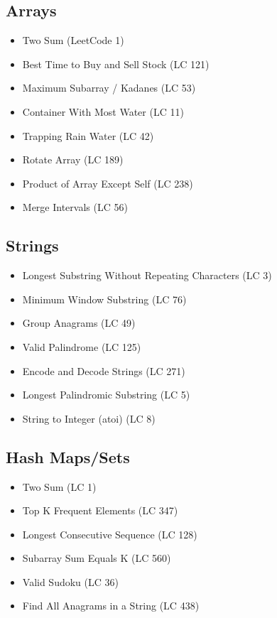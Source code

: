 \documentclass[11pt]{article}
\providecommand{\tightlist}{\setlength{\itemsep}{1pt}\setlength{\parskip}{0pt}}
\begin{document}
\subsection{Arrays}\label{arrays}

\begin{itemize}
\tightlist
\item
  Two Sum (LeetCode 1)
\item
  Best Time to Buy and Sell Stock (LC 121)
\item
  Maximum Subarray / Kadane\textquotesingle s (LC 53)
\item
  Container With Most Water (LC 11)
\item
  Trapping Rain Water (LC 42)
\item
  Rotate Array (LC 189)
\item
  Product of Array Except Self (LC 238)
\item
  Merge Intervals (LC 56)
\end{itemize}

\subsection{Strings}\label{strings-1}

\begin{itemize}
\tightlist
\item
  Longest Substring Without Repeating Characters (LC 3)
\item
  Minimum Window Substring (LC 76)
\item
  Group Anagrams (LC 49)
\item
  Valid Palindrome (LC 125)
\item
  Encode and Decode Strings (LC 271)
\item
  Longest Palindromic Substring (LC 5)
\item
  String to Integer (atoi) (LC 8)
\end{itemize}

\subsection{Hash Maps/Sets}\label{hash-mapssets}

\begin{itemize}
\tightlist
\item
  Two Sum (LC 1)
\item
  Top K Frequent Elements (LC 347)
\item
  Longest Consecutive Sequence (LC 128)
\item
  Subarray Sum Equals K (LC 560)
\item
  Valid Sudoku (LC 36)
\item
  Find All Anagrams in a String (LC 438)
\end{itemize}
\end{document}
